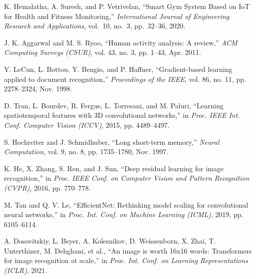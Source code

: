 \documentclass[conference]{IEEEtran}
\begin{document}
\begin{thebibliography}{00}

K. Hemalatha, A. Suresh, and P. Vetrivelan, ``Smart Gym System Based on IoT for Health and Fitness Monitoring,'' \emph{International Journal of Engineering Research and Applications}, vol.~10, no.~3, pp.~32--36, 2020.



J. K. Aggarwal and M. S. Ryoo, ``Human activity analysis: A review,'' \textit{ACM Computing Surveys (CSUR)}, vol. 43, no. 3, pp. 1–43, Apr. 2011.

Y. LeCun, L. Bottou, Y. Bengio, and P. Haffner, ``Gradient-based learning applied to document recognition,'' \textit{Proceedings of the IEEE}, vol. 86, no. 11, pp. 2278–2324, Nov. 1998.

D. Tran, L. Bourdev, R. Fergus, L. Torresani, and M. Paluri, ``Learning spatiotemporal features with 3D convolutional networks,'' in \textit{Proc. IEEE Int. Conf. Computer Vision (ICCV)}, 2015, pp. 4489–4497.


S. Hochreiter and J. Schmidhuber, ``Long short-term memory,'' \textit{Neural Computation}, vol. 9, no. 8, pp. 1735–1780, Nov. 1997.

K. He, X. Zhang, S. Ren, and J. Sun, ``Deep residual learning for image recognition,'' in \textit{Proc. IEEE Conf. on Computer Vision and Pattern Recognition (CVPR)}, 2016, pp. 770–778.

M. Tan and Q. V. Le, ``EfficientNet: Rethinking model scaling for convolutional neural networks,'' in \textit{Proc. Int. Conf. on Machine Learning (ICML)}, 2019, pp. 6105–6114.

A. Dosovitskiy, L. Beyer, A. Kolesnikov, D. Weissenborn, X. Zhai, T. Unterthiner, M. Dehghani, et al., ``An image is worth 16x16 words: Transformers for image recognition at scale,'' in \textit{Proc. Int. Conf. on Learning Representations (ICLR)}, 2021.


\end{thebibliography}
\end{document}

